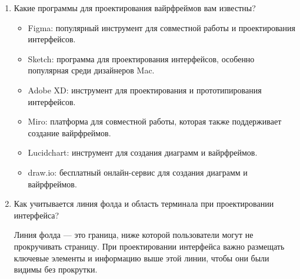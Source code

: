 \begin{enumerate}
\begin{itemize}
        \end{itemize}
    \item Какие программы для проектирования вайрфреймов вам известны?
        \begin{itemize}
            \item Figma: популярный инструмент для совместной работы и проектирования интерфейсов.
            \item Sketch: программа для проектирования интерфейсов, особенно популярная среди дизайнеров Mac.
            \item Adobe XD: инструмент для проектирования и прототипирования интерфейсов.
            \item Miro: платформа для совместной работы, которая также поддерживает создание вайрфреймов.
            \item Lucidchart: инструмент для создания диаграмм и вайрфреймов.
            \item draw.io: бесплатный онлайн-сервис для создания диаграмм и вайрфреймов.
        \end{itemize}
    \item Как учитывается линия фолда и область терминала при проектировании интерфейса?

    Линия фолда — это граница, ниже которой пользователи могут не прокручивать страницу. При проектировании интерфейса важно размещать ключевые элементы и информацию выше этой линии, чтобы они были видимы без прокрутки.
\end{enumerate}


